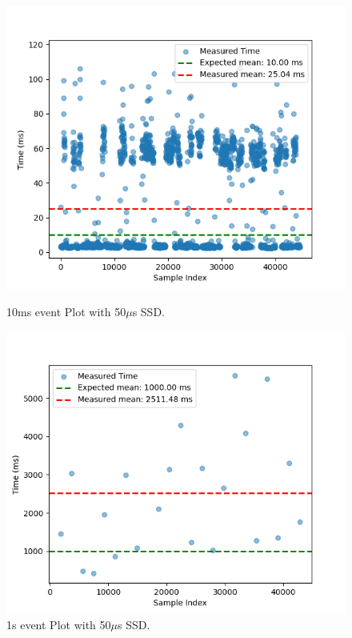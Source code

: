 \begin{figure}[h]
  \centering
  \begin{minipage}{0.49\textwidth}
    \centering
    \includegraphics[width=1\linewidth]{figures/scatter_50ssd_10ms.png}
    \caption{10ms event Plot with 50$\mu$s SSD.} 
    \label{fig:50ssd_10ms}
  \end{minipage}
  \hfill
  \begin{minipage}{0.5\textwidth}
    \centering
    \includegraphics[width=1\linewidth]{figures/scatter_50ssd_1s.png}
    \caption{1s event Plot with 50$\mu$s SSD.} 
    \label{fig:50ssd_1s}
  \end{minipage}
\end{figure}

